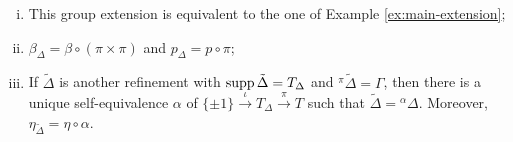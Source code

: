 \begin{thm}
\begin{enumerate}[(i)]
        \item This group extension is equivalent to the one of Example \ref{ex:main-extension}; \label{item:equivalent-extension-example}
        \item $\beta_\Delta = \beta \circ (\pi \times \pi)$ and $p_\Delta = p \circ \pi$; \label{item:beta-and-p-delta}
        \item If $\tilde \Delta$ is another refinement with $\operatorname{supp} \tilde \Delta = T_\Delta$ and ${}^\pi \tilde \Delta = \Gamma$, then there is a unique self-equivalence $\alpha$ of $\{ \pm 1 \} \xrightarrow{\iota} T_\Delta \xrightarrow{\pi} T$ such that $\tilde \Delta = {}^\alpha \Delta$. 
        Moreover, $\eta_{\tilde \Delta} = \eta \circ \alpha$. \label{item:number-of-extensions}
    \end{enumerate}
\end{thm}


